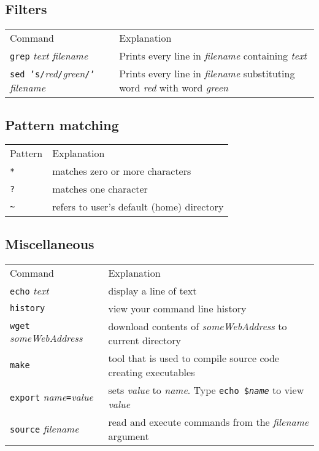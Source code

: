 \subsection{Filters}
\begin{tabular}{ll}
  Command & Explanation \\
  \hhline{==}
  \texttt{grep} \textit{text filename} & Prints every line in \textit{filename} containing \textit{text} \\
  \texttt{sed 's/}\textit{red}\texttt{/}\textit{green}\texttt{/'} \textit{filename} & Prints every line in \textit{filename} 
     substituting word \textit{red} with word \textit{green} 
\end{tabular}

\subsection{Pattern matching}
\begin{tabular}{ll}
  Pattern & Explanation \\
  \hhline{==}
  \texttt{*} & matches zero or more characters \\
  \texttt{?} & matches one character \\
  \texttt{\textasciitilde} & refers to user's default (home) directory
\end{tabular}

\subsection{Miscellaneous}
\begin{tabular}{ll}
  Command & Explanation \\
  \hhline{==}
  \texttt{echo} \textit{text} & display a line of text \\
  \texttt{history} & view your command line history \\
  \texttt{wget} \textit{someWebAddress} & download contents of \textit{someWebAddress} to current directory\\
  \texttt{make} & tool that is used to compile source code creating executables\\
  \texttt{export} \textit{name}\texttt{=}\textit{value} & sets \textit{value} to \textit{name}. Type \texttt{echo \$\textit{name}} to view \textit{value}\\
  \texttt{source} \textit{filename} & read and execute commands from the \textit{filename} argument \\
\end{tabular}  

